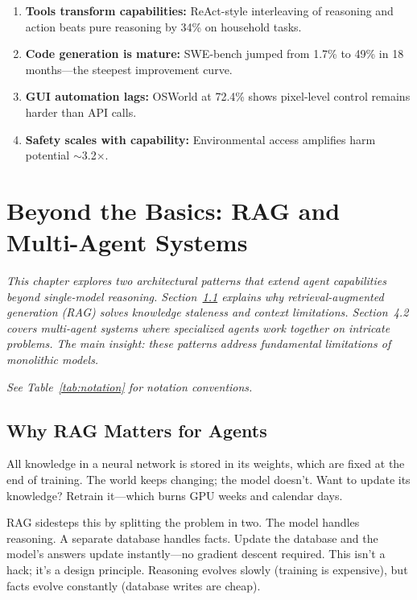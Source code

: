 \documentclass[12pt,a4paper]{report}
\theoremstyle{definition}
\begin{document}
\begin{tcolorbox}[colback=green!5!white, colframe=green!60!black, title=\textbf{Chapter 3 Key Takeaways}]
\begin{enumerate}
    \item \textbf{Tools transform capabilities:} ReAct-style interleaving of reasoning and action beats pure reasoning by 34\% on household tasks.
    \item \textbf{Code generation is mature:} SWE-bench jumped from 1.7\% to 49\% in 18 months---the steepest improvement curve.
    \item \textbf{GUI automation lags:} OSWorld at 72.4\% shows pixel-level control remains harder than API calls.
    \item \textbf{Safety scales with capability:} Environmental access amplifies harm potential $\sim$3.2$\times$.
\end{enumerate}
\end{tcolorbox}



\chapter{Beyond the Basics: RAG and Multi-Agent Systems}
\label{ch:advancedarch}

\textit{This chapter explores two architectural patterns that extend agent capabilities beyond single-model reasoning. Section~\ref{sec:rag-matters} explains why retrieval-augmented generation (RAG) solves knowledge staleness and context limitations. Section~4.2 covers multi-agent systems where specialized agents work together on intricate problems. The main insight: these patterns address fundamental limitations of monolithic models.
}

\vspace{0.3cm}
\noindent\textit{See Table~\ref{tab:notation} for notation conventions.}

\section{Why RAG Matters for Agents}
\label{sec:rag-matters}
All knowledge in a neural network is stored in its weights, which are fixed at the end of training. The world keeps changing; the model doesn't. Want to update its knowledge? Retrain it---which burns GPU weeks and calendar days.

RAG sidesteps this by splitting the problem in two. The model handles reasoning. A separate database handles facts. Update the database and the model's answers update instantly---no gradient descent required. This isn't a hack; it's a design principle. Reasoning evolves slowly (training is expensive), but facts evolve constantly (database writes are cheap).
\end{document}
